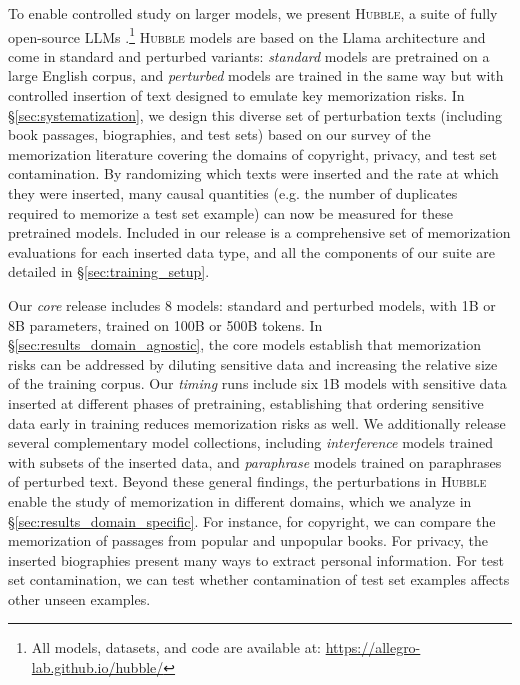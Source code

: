 To enable controlled study on larger models, we present \textsc{Hubble}, a suite of fully open-source LLMs \citep[similar to Pythia;][]{DBLP:conf/icml/BidermanSABOHKP23}.\footnote{All models, datasets, and code are available at: \url{https://allegro-lab.github.io/hubble/}} \textsc{Hubble} models are based on the Llama architecture \citep{grattafiori2024llama3herdmodels} and come in standard and perturbed variants: \textit{standard} models are pretrained on a large English corpus, and \textit{perturbed} models are trained in the same way but with controlled insertion of text designed to emulate key memorization risks. In \S\ref{sec:systematization}, we design this diverse set of perturbation texts (including book passages, biographies, and test sets) based on our survey of the memorization literature covering the domains of copyright, privacy, and test set contamination. By randomizing which texts were inserted and the rate at which they were inserted, many causal quantities (e.g. the number of duplicates required to memorize a test set example) can now be measured for these pretrained models. Included in our release is a comprehensive set of memorization evaluations for each inserted data type, and all the components of our suite are detailed in \S\ref{sec:training_setup}.

Our \textit{core} release includes 8 models: standard and perturbed models, with 1B or 8B parameters, trained on 100B or 500B tokens. In \S\ref{sec:results_domain_agnostic}, the core models establish that memorization risks can be addressed by diluting sensitive data and increasing the relative size of the training corpus. Our \textit{timing} runs include six 1B models with sensitive data inserted at different phases of pretraining, establishing that ordering sensitive data early in training reduces memorization risks as well. We additionally release several complementary model collections, including \textit{interference} models trained with subsets of the inserted data, and \textit{paraphrase} models trained on paraphrases of perturbed text. Beyond these general findings, the perturbations in \textsc{Hubble} enable the study of memorization in different domains, which we analyze in \S\ref{sec:results_domain_specific}. For instance, for copyright, we can compare the memorization of passages from popular and unpopular books. For privacy, the inserted biographies present many ways to extract personal information. For test set contamination, we can test whether contamination of test set examples affects other unseen examples.

